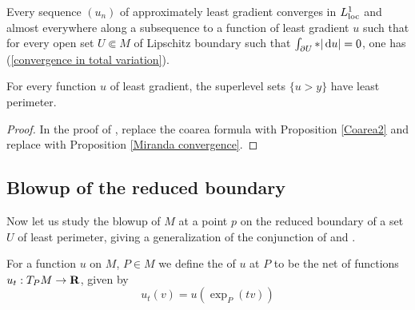 \begin{corollary}\label{compactness}
Every sequence $(u_n)$ of approximately least gradient converges in $L^1_{\mathrm{loc}}$ and almost everywhere along a subsequence to a function of least gradient $u$ such that for every open set $U \Subset M$ of Lipschitz boundary such that $\int_{\partial U} *|\mathop{}\!\mathrm{d} u| = 0$, one has (\ref{convergence in total variation}).
\end{corollary}

\begin{proposition}\label{level sets are minimal}
For every function $u$ of least gradient, the superlevel sets $\{u > y\}$ have least perimeter.
\end{proposition}
\begin{proof}
In the proof of \cite[Theorem 1]{BOMBIERI1969}, replace the coarea formula \cite[Theorem 1.6]{Miranda66} with Proposition \ref{Coarea2} and replace \cite[Teorema 3]{Miranda67} with Proposition \ref{Miranda convergence}.
\end{proof}


\subsection{Blowup of the reduced boundary}
Now let us study the blowup of $M$ at a point $p$ on the reduced boundary of a set $U$ of least perimeter, giving a generalization of the conjunction of \cite[Theorem 9.3]{Giusti77} and \cite[Theorem 6.2.2]{Simons68}.

\begin{definition}
For a function $u$ on $M$, $P \in M$ we define the  of $u$ at $P$ to be the net of functions $u_t: T_PM \to \mathbf{R}$, given by
$$u_t(v) = u\left(\exp_P(tv)\right)$$
\end{definition}

